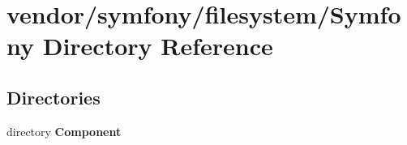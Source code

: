 \section{vendor/symfony/filesystem/\+Symfony Directory Reference}
\label{dir_d6bdb34bc58f9c6583ab43baeadf9124}
\subsection*{Directories}
\begin{DoxyCompactItemize}
\item 
directory {\bf Component}
\end{DoxyCompactItemize}

